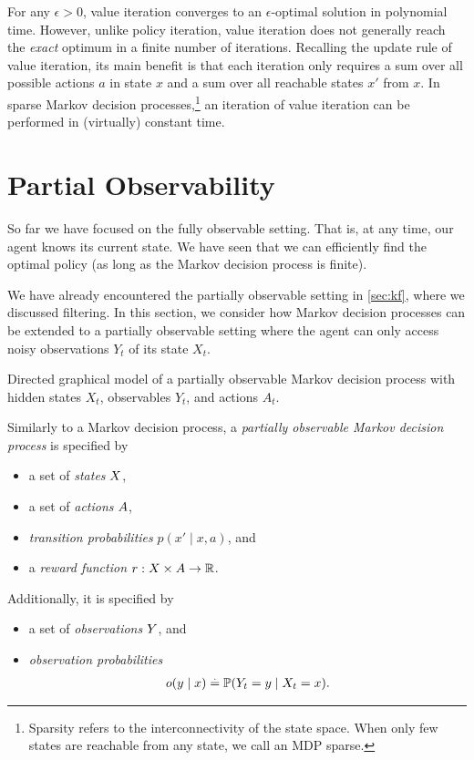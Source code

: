 For any $\epsilon > 0$, value iteration converges to an $\epsilon$-optimal solution in polynomial time.
However, unlike policy iteration, value iteration does not generally reach the \emph{exact} optimum in a finite number of iterations.
Recalling the update rule of value iteration, its main benefit is that each iteration only requires a sum over all possible actions $a$ in state $x$ and a sum over all reachable states $x'$ from $x$.
In sparse Markov decision processes,\footnote{Sparsity refers to the interconnectivity of the state space. When only few states are reachable from any state, we call an MDP sparse.} an iteration of value iteration can be performed in (virtually) constant time.


\section{Partial Observability}\label{sec:mdp:partial_observability}

So far we have focused on the fully observable setting.
That is, at any time, our agent knows its current state.
We have seen that we can efficiently find the optimal policy (as long as the Markov decision process is finite).

We have already encountered the partially observable setting in \cref{sec:kf}, where we discussed filtering.
In this section, we consider how Markov decision processes can be extended to a partially observable setting where the agent can only access noisy observations $Y_t$ of its state $X_t$.

\begin{marginfigure}[5\baselineskip]
  \caption{Directed graphical model of a partially observable Markov decision process with hidden states $X_t$, observables $Y_t$, and actions $A_t$.}
\end{marginfigure}

\begin{defn}
  Similarly to a Markov decision process, a \emph{partially observable Markov decision process} is specified by \begin{itemize}
    \item a set of \emph{states} $X$,
    \item a set of \emph{actions} $A$,
    \item \emph{transition probabilities} $p(x' \mid x, a)$, and
    \item a \emph{reward function} $r : X \times A \to \mathbb{R}$.
  \end{itemize} Additionally, it is specified by \begin{itemize}
    \item a set of \emph{observations} $Y$, and
    \item \emph{observation probabilities} \begin{align}
      o(y \mid x) \defeq \Pr{Y_t = y \mid X_t = x}. \label{eq:observation_probability}
    \end{align}
  \end{itemize}
\end{defn}

